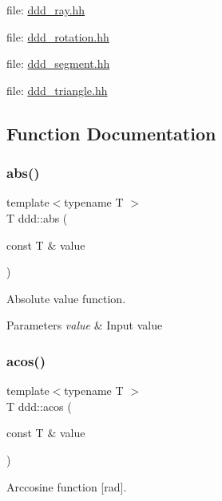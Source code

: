 file\+: \hyperlink{ddd__ray_8hh_source}{ddd\+\_\+ray.\+hh}

file\+: \hyperlink{ddd__rotation_8hh_source}{ddd\+\_\+rotation.\+hh}

file\+: \hyperlink{ddd__segment_8hh_source}{ddd\+\_\+segment.\+hh}

file\+: \hyperlink{ddd__triangle_8hh_source}{ddd\+\_\+triangle.\+hh} 

\subsection{Function Documentation}
\mbox{\label{namespaceddd_a9ac20d4240d0a9fa208e3dd220101a0a}} 
\subsubsection{\texorpdfstring{abs()}{abs()}}
{\footnotesize\ttfamily template$<$typename T $>$ \\
T ddd\+::abs (\begin{DoxyParamCaption}\item[{const T \&}]{value }\end{DoxyParamCaption})\hspace{0.3cm}{\ttfamily [inline]}}



Absolute value function. 


\begin{DoxyParams}{Parameters}
{\em value} & Input value \\
\hline
\end{DoxyParams}
\mbox{\label{namespaceddd_a03e440b351f44fec5abac1270231e3bb}} 
\subsubsection{\texorpdfstring{acos()}{acos()}}
{\footnotesize\ttfamily template$<$typename T $>$ \\
T ddd\+::acos (\begin{DoxyParamCaption}\item[{const T \&}]{value }\end{DoxyParamCaption})\hspace{0.3cm}{\ttfamily [inline]}}



Arccosine function \mbox{[}rad\mbox{]}. 


